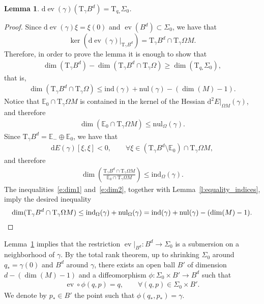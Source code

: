 \documentclass[reqno]{amsart}
\numberwithin{equation}{section}
\theoremstyle{personal}%
\newtheorem{lem}[thm]{Lemma}
\theoremstyle{definition}
\newcommand{\E}{\mathds{E}}
\newcommand{\diff}{\mathrm{d}}
\newcommand{\Tan}{\mathrm{T}}
\newcommand{\ind}{\mathrm{ind}}
\newcommand{\nul}{\mathrm{nul}}
\DeclareMathOperator{\ev}{\mathrm{ev}}
\begin{document}
\begin{lem}\label{l:ev_submersion}
$\diff\ev(\gamma)(\Tan_\gamma B^d)=\Tan_{q_*}\Sigma_0$.
\end{lem}

\begin{proof}
Since $\diff\ev(\gamma)\xi=\xi(0)$ and $\ev(B^d)\subset\Sigma_0$, we have that
\[\ker (\diff\ev(\gamma)|_{\Tan_\gamma B^d}) = \Tan_\gamma B^d \cap \Tan_\gamma\Omega M.\]
Therefore, in order to prove the lemma it is enough to show that 
\begin{align*}
\dim(\Tan_\gamma B^d) - \dim(\Tan_\gamma B^d\cap\Tan_\gamma\Omega) \geq \dim(\Tan_{q_*}\Sigma_0),
\end{align*}
that is,
\begin{align*}
\dim(\Tan_\gamma B^d\cap\Tan_\gamma\Omega) \leq \ind(\gamma)+\nul(\gamma) - (\dim(M)-1).
\end{align*}
Notice that $\E_0\cap\Tan_\gamma\Omega M$ is contained in the kernel of the Hessian $\diff^2E|_{\Omega M}(\gamma)$, and therefore 
\begin{align}
\label{e:dim1}
\dim(\E_0\cap\Tan_\gamma\Omega M)\leq\nul_\Omega(\gamma). 
\end{align}
Since $\Tan_\gamma B^d=\E_-\oplus \E_0$, we have that 
\begin{align*}
 \diff E(\gamma)[\xi,\xi]<0,
 \qquad
 \forall\xi\in (\Tan_\gamma B^d\setminus\E_0)\cap\Tan_\gamma\Omega M,
\end{align*}
and therefore
\begin{align}\label{e:dim2}
\dim\left(\frac{\Tan_\gamma B^d\cap\Tan_\gamma\Omega M}{\E_0\cap\Tan_\gamma\Omega M}\right)\leq\ind_\Omega(\gamma).
\end{align}
The inequalities~\eqref{e:dim1} and~\eqref{e:dim2}, together with Lemma~\ref{l:equality_indices}, imply the desired inequality
\[
\dim(\Tan_\gamma B^d\cap\Tan_\gamma\Omega M)
\leq
\ind_\Omega(\gamma) + \nul_\Omega(\gamma)
=
\ind(\gamma)+\nul(\gamma)-(\dim(M)-1).
\qedhere
\]
\end{proof}

Lemma~\ref{l:ev_submersion} implies that the restriction $\ev|_{B^d}:B^d\to\Sigma_0$ is a submersion on a neighborhood of $\gamma$. By the total rank theorem, up to shrinking $\Sigma_0$ around $q_*=\gamma(0)$ and $B^d$ around $\gamma$, there exists an open ball $B'$ of dimension $d-(\dim(M)-1)$ and a diffeomorphism $\phi:\Sigma_0\times B'\to B^d$ such that 
\begin{align*}
 \ev\circ\phi(q,p)=q,
\qquad
 \forall (q,p)\in \Sigma_0\times B'.
\end{align*}
We denote by $p_*\in B'$ the point such that $\phi(q_*,p_*)=\gamma$.
\end{document}
